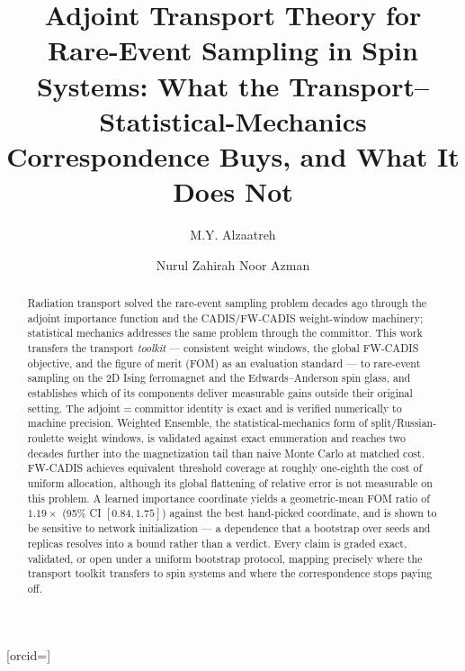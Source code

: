 \documentclass[a4paper,fleqn]{cas-sc}
\begin{document}
\let\WriteBookmarks\relax
\def\floatpagepagefraction{1}
\def\textpagefraction{.001}



\title[mode=title]{Adjoint Transport Theory for Rare-Event Sampling in Spin Systems: What the Transport--Statistical-Mechanics Correspondence Buys, and What It Does Not}

\author[1,2]{M.Y. Alzaatreh}



\author[1]{Nurul Zahirah Noor Azman}[orcid=]
\cormark[1]


\begin{abstract}
Radiation transport solved the rare-event sampling problem decades ago through the adjoint importance function and the CADIS/FW-CADIS weight-window machinery; statistical mechanics addresses the same problem through the committor. This work transfers the transport \emph{toolkit} --- consistent weight windows, the global FW-CADIS objective, and the figure of merit (FOM) as an evaluation standard --- to rare-event sampling on the 2D Ising ferromagnet and the Edwards--Anderson spin glass, and establishes which of its components deliver measurable gains outside their original setting. The adjoint$=$committor identity is exact and is verified numerically to machine precision. Weighted Ensemble, the statistical-mechanics form of split/Russian-roulette weight windows, is validated against exact enumeration and reaches two decades further into the magnetization tail than naive Monte Carlo at matched cost. FW-CADIS achieves equivalent threshold coverage at roughly one-eighth the cost of uniform allocation, although its global flattening of relative error is not measurable on this problem. A learned importance coordinate yields a geometric-mean FOM ratio of $1.19\times$ (95\% CI $[0.84,1.75]$) against the best hand-picked coordinate, and is shown to be sensitive to network initialization --- a dependence that a bootstrap over seeds and replicas resolves into a bound rather than a verdict. Every claim is graded exact, validated, or open under a uniform bootstrap protocol, mapping precisely where the transport toolkit transfers to spin systems and where the correspondence stops paying off.
\end{abstract}
\end{document}
